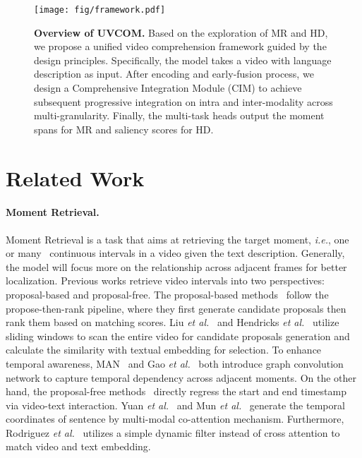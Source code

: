 \begin{figure*}
    \centering
    \texttt{[image: fig/framework.pdf]}
    \caption{\textbf{Overview of UVCOM.} Based on the exploration of MR and HD, we propose a unified video comprehension framework guided by the design principles. Specifically, the model takes a video with language description as input. After encoding and early-fusion process, we design a Comprehensive Integration Module (CIM) to achieve subsequent progressive integration on intra and inter-modality across multi-granularity. Finally, the multi-task heads output the moment spans for MR and saliency scores for HD.}
    \label{fig:framework}
    \vspace{-10pt}
\end{figure*}
\section{Related Work}
\label{sec:related_work}
\paragraph{Moment Retrieval.} Moment Retrieval is a task that aims at retrieving the target moment, \textit{i.e.}, one~\cite{ctrl} or many~\cite{tvr} continuous intervals in a video given the text description. Generally, the model will focus more on the relationship across adjacent frames for better localization. Previous works retrieve video intervals into two perspectives: proposal-based and proposal-free. The proposal-based methods~\cite{hendricks, bpn, ctrl, mpn} follow the propose-then-rank pipeline, where they first generate candidate proposals then rank them based on matching scores. Liu \textit{et al.}~\cite{liumeng-2018} and Hendricks \textit{et al.}~\cite{hendricks} utilize sliding windows to scan the entire video for candidate proposals generation and calculate the similarity with textual embedding for selection. 
To enhance temporal awareness, MAN~\cite{man} and Gao \textit{et al.}~\cite{gao_2021} both introduce graph convolution network to capture temporal dependency across adjacent moments. 
On the other hand, the proposal-free methods~\cite{yuan_2019, mun_2020, rodriguez_2020, VSLNET, li_2021, Tang_2022} directly regress the start and end timestamp via video-text interaction. Yuan \textit{et al.}~\cite{yuan_2019} and Mun \textit{et al.}~\cite{mun_2020} generate the temporal coordinates of sentence by multi-modal co-attention mechanism. Furthermore, Rodriguez \textit{et al.}~\cite{rodriguez_2020} utilizes a simple dynamic filter instead of cross attention to match video and text embedding. 

